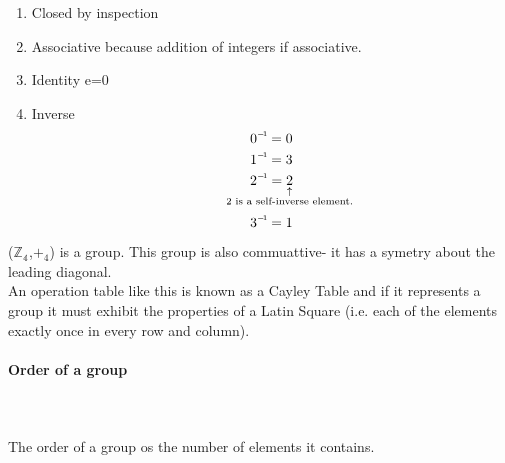 \documentclass[a4paper]{article}
\newcommand\inv[1]{#1\raisebox{1.15ex}{$\scriptscriptstyle-\!1$}}
\begin{document}
\begin{enumerate}
\item
  Closed \checkmark  by inspection
\item
  Associative \checkmark because addition of integers if associative.
\item
  Identity \checkmark e=0
\item
  Inverse
  \[ \inv{0} = 0 \]
  \[ \inv{1} = 3 \]
  \[ \inv{2} = \underset{\mathclap{\substack{\uparrow \\ \text{2 is a self-inverse element.}}}}{2} \]
  \[ \inv{3} = 1 \]
\end{enumerate}
\therefore ($\mathbb{Z_4}$,${+_4}$) is a group.
This group is also commuattive- it has a symetry about the leading diagonal.\\
An operation table like this is known as a Cayley Table and if it represents a group it must exhibit the properties of a Latin Square (i.e. each of the elements exactly once in every row and column).

\paragraph{Order of a group}\mbox{}\\ \\
The order of a group os the number of elements it contains.
\end{document}

